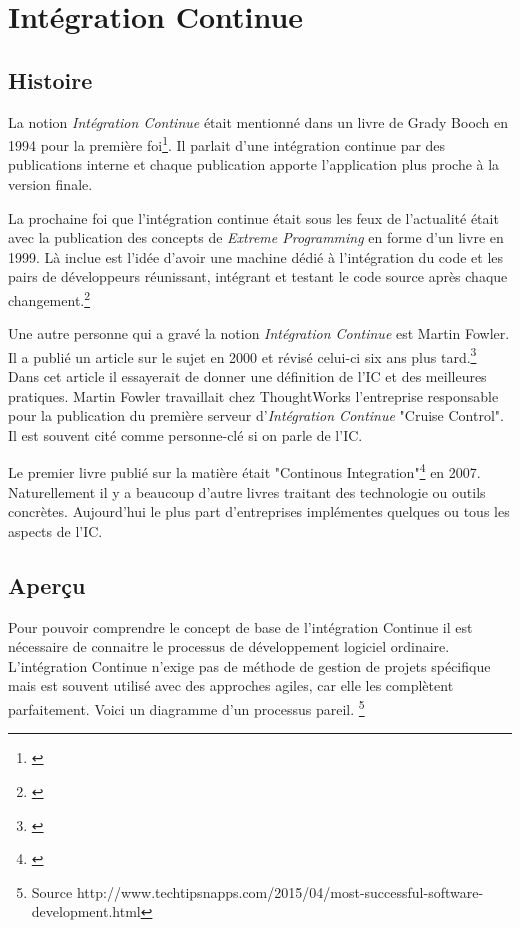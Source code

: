\chapter{Intégration Continue}
\label{chap:integrationcontinue}

\section{Histoire}
La notion \textit{Intégration Continue} était mentionné dans un livre de Grady Booch en 1994 pour la première foi\footnote{\cite{boochooad}}. Il parlait d'une intégration continue par des publications interne et chaque publication apporte l'application plus proche à la version finale.

La prochaine foi que l'intégration continue était sous les feux de l'actualité était avec la publication des concepts de \textit{Extreme Programming} en forme d'un livre en 1999.
Là inclue est l'idée d'avoir une machine dédié à l'intégration du code et les pairs de développeurs réunissant, intégrant et testant le code source après chaque changement.\footnote{\cite{robertshistory}}

Une autre personne qui a gravé la notion \textit{Intégration Continue} est Martin Fowler. Il a publié un article sur le sujet en 2000 et révisé celui-ci six ans plus tard.\footnote{\cite{fowlerci}} Dans cet article il essayerait de donner une définition de l'IC et des meilleures pratiques. Martin Fowler travaillait chez ThoughtWorks l'entreprise responsable pour la publication du première serveur d'\textit{Intégration Continue} "Cruise Control". Il est souvent cité comme personne-clé si on parle de l'IC.

Le premier livre publié sur la matière était "Continous Integration"\footnote{\cite{duvallconint}} en 2007. Naturellement il y a beaucoup d'autre livres traitant des technologie ou outils concrètes. Aujourd'hui le plus part d'entreprises implémentes quelques ou tous les aspects de l'IC.

\nocite{wikici}
\newpage

\section{Aperçu}
Pour pouvoir comprendre le concept de base de l'intégration Continue il est nécessaire de connaitre le processus de développement logiciel ordinaire. L'intégration Continue n'exige pas de méthode de gestion de projets spécifique mais est souvent utilisé avec des approches agiles, car elle les complètent parfaitement. Voici un diagramme d'un processus pareil. \footnote{Source http://www.techtipsnapps.com/2015/04/most-successful-software-development.html}


